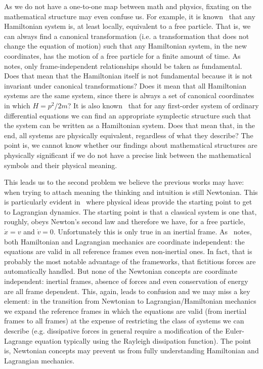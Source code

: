 \documentclass[11pt]{elsarticle}
\begin{document}
As we do not have a one-to-one map between math and physics, fixating on the mathematical structure may even confuse us. For example, it is known~\cite{AllHamFreeParticle} that any Hamiltonian system is, at least locally, equivalent to a free particle. That is, we can always find a canonical transformation (i.e. a transformation that does not change the equation of motion) such that any Hamiltonian system, in the new coordinates, has the motion of a free particle for a finite amount of time. As~\cite{North} notes, only frame-independent relationships should be taken as fundamental. Does that mean that the Hamiltonian itself is not fundamental because it is not invariant under canonical transformations? Does it mean that all Hamiltonian systems are the same system, since there is always a set of canonical coordinates in which $H=p^2/2m$? It is also known~\cite{AllSystemsAreHam} that for any first-order system of ordinary differential equations we can find an appropriate symplectic structure such that the system can be written as a Hamiltonian system. Does that mean that, in the end, all systems are physically equivalent, regardless of what they describe? The point is, we cannot know whether our findings about mathematical structures are physically significant if we do not have a precise link between the mathematical symbols and their physical meaning.

This leads us to the second problem we believe the previous works may have: when trying to attach meaning the thinking and intuition is still Newtonian. This is particularly evident in~\cite{Curiel} where physical ideas provide the starting point to get to Lagrangian dynamics. The starting point is that a classical system is one that, roughly, obeys Newton's second law and therefore we have, for a free particle, $\dot{x} = v$ and $\dot{v} = 0$. Unfortunately this is only true in an inertial frame. As~\cite{North} notes, both Hamiltonian and Lagrangian mechanics are coordinate independent: the equations are valid in all reference frames even non-inertial ones. In fact, that is probably the most notable advantage of the frameworks, that fictitious forces are automatically handled. But none of the Newtonian concepts are coordinate independent: inertial frames, absence of forces and even conservation of energy are all frame dependent. This, again, leads to confusion and we may miss a key element: in the transition from Newtonian to Lagrangian/Hamiltonian mechanics we expand the reference frames in which the equations are valid (from inertial frames to all frames) at the expense of restricting the class of systems we can describe (e.g. dissipative forces in general require a modification of the Euler-Lagrange equation typically using the Rayleigh dissipation function). The point is, Newtonian concepts may prevent us from fully understanding Hamiltonian and Lagrangian mechanics.
\end{document}
